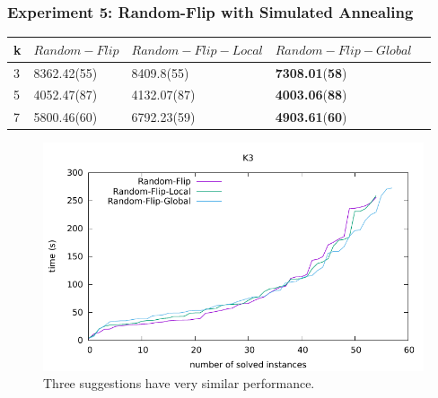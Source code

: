 \documentclass[12pt,a4paper,twoside]{scrartcl}
\numberwithin{equation}{section}
\begin{document}
\subsubsection{Experiment 5: Random-Flip with Simulated Annealing} 
\label{sec:Experiment 5}
  \begin{table}[H]
\begin{center}
    \begin{tabular}{|l|l|l|l|p{3cm}|}
\hline 

    k &$Random-Flip$&$Random-Flip-Local$&$Random-Flip-Global$ \\ \hline      
    3 &  8362.42(55)&8409.8(55)	&\textbf{7308.01}(\textbf{58})\\ \hline
    5&4052.47(87)&	4132.07(87)&\textbf{4003.06}(\textbf{88}) \\ \hline
    7& 5800.46(60) &6792.23(59) &	\textbf{4903.61}(\textbf{60})\\ \hline
	
\end{tabular}
\end{center}
\end{table}
  \begin{figure}[H]
\begin{center}
  \includegraphics[scale = 1]{DATA/K3/e3r.pdf}
  \end{center}
  \caption{Three suggestions have very similar performance.}
  \label{Experiment 5 k3 cactus plot}
  \end{figure}
\end{document}
